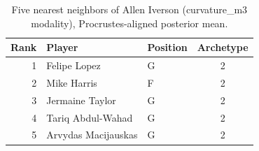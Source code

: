 \begin{table}[htbp]
  \centering\small
  \begin{tabular}{rllc}
    \toprule
    Rank & Player & Position & Archetype \\
    \midrule
    1 & Felipe Lopez & G & 2 \\
    2 & Mike Harris & F & 2 \\
    3 & Jermaine Taylor & G & 2 \\
    4 & Tariq Abdul-Wahad & G & 2 \\
    5 & Arvydas Macijauskas & G & 2 \\
    \bottomrule
  \end{tabular}
  \caption{Five nearest neighbors of Allen Iverson (curvature_m3 modality), Procrustes-aligned posterior mean.}
  \label{tab:Allen_Iverson_neighbors_curvature_m3}
\end{table}


